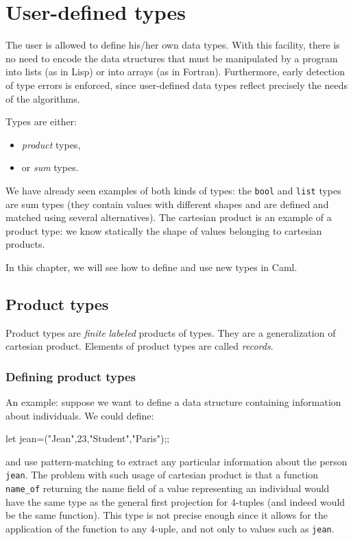 \chapter{User-defined types}
\label{c:udeftypes}

The user is allowed to define his/her own data types.
With this facility, there is no need to encode
the data structures that must be manipulated by a program into lists
(as in Lisp) or into arrays (as in Fortran). Furthermore, early
detection of type errors is enforced, since user-defined data types reflect
precisely the needs of the algorithms. %

Types are either:
\begin{itemize}
\item {\em product} types,
\item or {\em sum} types.
\end{itemize}

We have already seen examples of both kinds of types: the {\tt bool} and
{\tt list} types are sum types (they contain values with different shapes
and are defined and matched using several alternatives). The
cartesian product is an example of a product type: we know statically
the shape of values belonging to cartesian products.

In this chapter, we will see how to define and use new types in Caml.

%
\section{Product types}
\label{s:udefprodtypes}

Product types are {\em finite} {\em labeled} products of types.
They are a generalization of cartesian product.
Elements of product types are called {\em records}.

\subsection{Defining product types}

An example: suppose we want to define a data structure containing
information about individuals. We could define:
\begin{caml_example}
let jean=("Jean",23,"Student","Paris");;
\end{caml_example}
and use pattern-matching to extract any particular
information about the person {\tt jean}.
The problem with such usage of cartesian product is that a function
\verb"name_of" returning the name field of a value representing an individual
would have the same type as the general first projection for 4-tuples
(and indeed would be the same function). This type is not precise enough
since it allows for the application of the function to any 4-uple, and
not only to values such as {\tt jean}.

